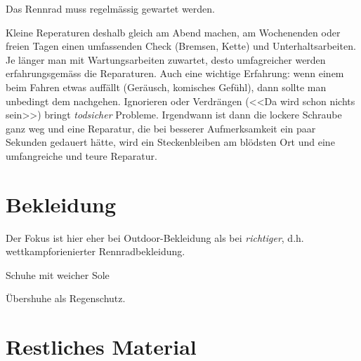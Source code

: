 Das Rennrad muss regelmässig gewartet werden.

Kleine Reperaturen deshalb gleich am Abend machen, am Wochenenden oder freien Tagen einen umfassenden Check (Bremsen, Kette) und Unterhaltsarbeiten.
Je länger man mit Wartungsarbeiten zuwartet, desto umfagreicher werden erfahrungsgemäss die Reparaturen.
Auch eine wichtige Erfahrung: wenn einem beim Fahren etwas auffällt (Geräusch, komisches Gefühl), dann sollte man unbedingt dem nachgehen.
Ignorieren oder Verdrängen (<<Da wird schon nichts sein>>) bringt \emph{todsicher} Probleme.
Irgendwann ist dann die lockere Schraube ganz weg und eine Reparatur, die bei besserer Aufmerksamkeit ein paar Sekunden gedauert hätte,
wird ein Steckenbleiben am blödsten Ort und eine umfangreiche und teure Reparatur.


\section{Bekleidung}

Der Fokus ist hier eher bei Outdoor-Bekleidung als bei \emph{richtiger}, d.h. wettkampforienierter Rennradbekleidung.

Schuhe mit weicher Sole

Übershuhe als Regenschutz.

\section{Restliches Material}




